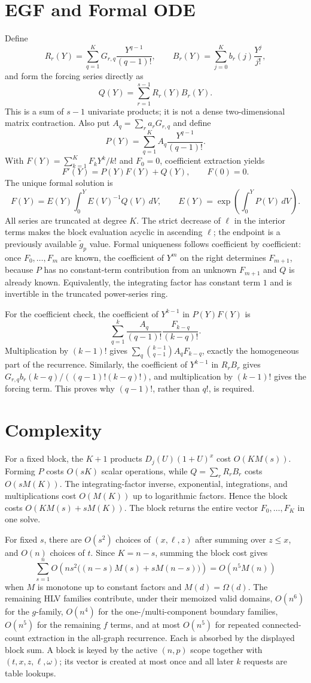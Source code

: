\documentclass[10pt]{article}
\begin{document}
\section{EGF and Formal ODE}
Define
\[
R_r(Y)=\sum_{q=1}^{K}G_{r,q}\frac{Y^{q-1}}{(q-1)!},\qquad B_r(Y)=\sum_{j=0}^{K}b_r(j)\frac{Y^j}{j!},
\]
and form the forcing series directly as
\[
Q(Y)=\sum_{r=1}^{s-1}R_r(Y)B_r(Y).
\]
This is a sum of $s-1$ univariate products; it is not a dense two-dimensional matrix contraction. Also put $A_q=\sum_ra_rG_{r,q}$ and define
\[
P(Y)=\sum_{q=1}^{K}A_q\frac{Y^{q-1}}{(q-1)!}.
\]
With $F(Y)=\sum_{k=1}^{K}F_kY^k/k!$ and $F_0=0$, coefficient extraction yields
\[
F'(Y)=P(Y)F(Y)+Q(Y),\qquad F(0)=0.
\]
The unique formal solution is
\[
F(Y)=E(Y)\int_0^Y E(V)^{-1}Q(V)\,dV,
\qquad E(Y)=\exp\!\left(\int_0^YP(V)\,dV\right).
\]
All series are truncated at degree $K$. The strict decrease of $\ell$ in the interior terms makes the block evaluation acyclic in ascending $\ell$; the endpoint is a previously available $\widetilde g_p$ value. Formal uniqueness follows coefficient by coefficient: once $F_0,\ldots,F_m$ are known, the coefficient of $Y^m$ on the right determines $F_{m+1}$, because $P$ has no constant-term contribution from an unknown $F_{m+1}$ and $Q$ is already known. Equivalently, the integrating factor has constant term $1$ and is invertible in the truncated power-series ring.

For the coefficient check, the coefficient of $Y^{k-1}$ in $P(Y)F(Y)$ is
\[
\sum_{q=1}^{k}\frac{A_q}{(q-1)!}\frac{F_{k-q}}{(k-q)!}.
\]
Multiplication by $(k-1)!$ gives $\sum_q\binom{k-1}{q-1}A_qF_{k-q}$, exactly the homogeneous part of the recurrence. Similarly, the coefficient of $Y^{k-1}$ in $R_rB_r$ gives $G_{r,q}b_r(k-q)/((q-1)!(k-q)!)$, and multiplication by $(k-1)!$ gives the forcing term. This proves why $(q-1)!$, rather than $q!$, is required.

\section{Complexity}
For a fixed block, the $K+1$ products $D_j(U)(1+U)^x$ cost $O(KM(s))$. Forming $P$ costs $O(sK)$ scalar operations, while $Q=\sum_rR_rB_r$ costs $O(sM(K))$. The integrating-factor inverse, exponential, integrations, and multiplications cost $O(M(K))$ up to logarithmic factors. Hence the block costs $O(KM(s)+sM(K))$. The block returns the entire vector $F_0,\ldots,F_K$ in one solve.

For fixed $s$, there are $O(s^2)$ choices of $(x,\ell,z)$ after summing over $z\le x$, and $O(n)$ choices of $t$. Since $K=n-s$, summing the block cost gives
\[
 \sum_{s=1}^n O\!\left(n s^2\big((n-s)M(s)+sM(n-s)\big)\right)
 =O(n^5M(n))
\]
when $M$ is monotone up to constant factors and $M(d)=\Omega(d)$. The remaining HLV families contribute, under their memoized valid domains, $O(n^6)$ for the $g$-family, $O(n^4)$ for the one-/multi-component boundary families, $O(n^5)$ for the remaining $f$ terms, and at most $O(n^5)$ for repeated connected-count extraction in the all-graph recurrence. Each is absorbed by the displayed block sum. A block is keyed by the active $(n,p)$ scope together with $(t,x,z,\ell,\omega)$; its vector is created at most once and all later $k$ requests are table lookups.
\end{document}
